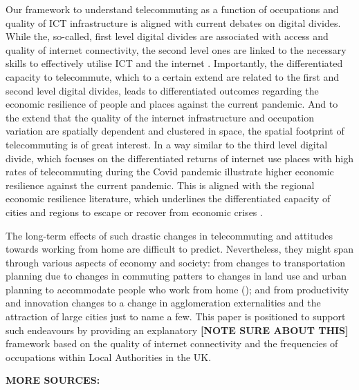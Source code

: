 \documentclass[]{interact}
\theoremstyle{plain}%
\theoremstyle{definition}
\theoremstyle{remark}
\begin{document}
Our framework to understand telecommuting as a function of occupations
and quality of ICT infrastructure is aligned with current debates on
digital divides. While the, so-called, first level digital divides are
associated with access and quality of internet connectivity, the second
level ones are linked to the necessary skills to effectively utilise ICT
and the internet \citep{blank2014dimensions, van2011internet}.
Importantly, the differentiated capacity to telecommute, which to a
certain extend are related to the first and second level digital
divides, leads to differentiated outcomes regarding the economic
resilience of people and places against the current pandemic. And to the
extend that the quality of the internet infrastructure and occupation
variation are spatially dependent and clustered in space, the spatial
footprint of telecommuting is of great interest. In a way similar to the
third level digital divide, which focuses on the differentiated returns
of internet use \citep{stern2009levels, van2014digital, van2015third}
places with high rates of telecommuting during the Covid pandemic
illustrate higher economic resilience against the current pandemic. This
is aligned with the regional economic resilience literature, which
underlines the differentiated capacity of cities and regions to escape
or recover from economic crises
\citep{martin2012regional, kitsos2018economic}.

The long-term effects of such drastic changes in telecommuting and
attitudes towards working from home are difficult to predict.
Nevertheless, they might span through various aspects of economy and
society: from changes to transportation planning due to changes in
commuting patters to changes in land use and urban planning to
accommodate people who work from home (\citet{BUDNITZ2020102713}); and
from productivity and innovation changes to a change in agglomeration
externalities and the attraction of large cities \citep{econobs} just to
name a few. This paper is positioned to support such endeavours by
providing an explanatory \textbf{{[}NOTE SURE ABOUT THIS{]}} framework
based on the quality of internet connectivity and the frequencies of
occupations within Local Authorities in the UK.

\textbf{MORE SOURCES:}
\end{document}
